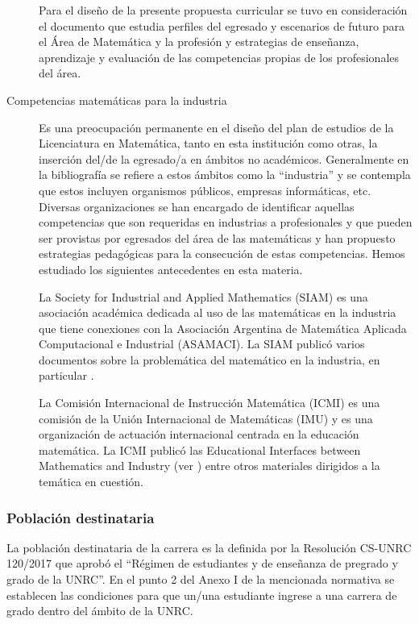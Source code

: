 \documentclass[a4paper, 12pt]{article}
\begin{document}
\begin{description}
Para el diseño de la presente propuesta curricular se tuvo en consideración el documento \cite{paniagua2013educacion} 
que estudia perfiles del egresado y escenarios de futuro para el Área de Matemática y la profesión y estrategias de enseñanza, aprendizaje y evaluación de las competencias propias de los profesionales del área. 

\item[Competencias matemáticas para la industria] 
Es una preocupación permanente en el diseño del plan de estudios de la Licenciatura en Matemática, tanto en esta institución como otras, la inserción del/de la egresado/a en ámbitos no académicos. Generalmente  en la bibliografía se refiere a estos ámbitos como la ``industria'' y  se contempla que estos incluyen organismos públicos, empresas informáticas, etc. Diversas organizaciones se han encargado de identificar aquellas competencias que son requeridas en industrias a profesionales y que pueden ser provistas por egresados del área de las matemáticas y han propuesto estrategias pedagógicas para la consecución de estas competencias. Hemos estudiado los siguientes antecedentes en esta materia.

La Society for Industrial and Applied Mathematics (SIAM)  es una asociación académica dedicada al uso de las matemáticas en la industria que tiene conexiones con la Asociación Argentina de Matemática Aplicada Computacional e Industrial (ASAMACI). La SIAM publicó varios documentos sobre la problemática del matemático en la industria, en particular \cite{society1996siam,society2012siam}.


 La Comisión Internacional de Instrucción Matemática (ICMI) es una comisión de la Unión Internacional de Matemáticas (IMU) y es una organización de actuación internacional centrada en la educación matemática. La ICMI publicó las Educational Interfaces between Mathematics and Industry (ver \cite{damlamian2013educational}) entre otros materiales dirigidos a la temática en cuestión.
\end{description}



\subsubsection{Población destinataria}

La población destinataria de la carrera es la definida por la Resolución CS-UNRC 120/2017 que aprobó el ``Régimen  de estudiantes y de enseñanza de pregrado y grado de la UNRC''. En el punto 2 del Anexo I de la mencionada normativa se establecen las condiciones para que un/una estudiante ingrese a una carrera de grado dentro del ámbito de la UNRC.
\end{document}
